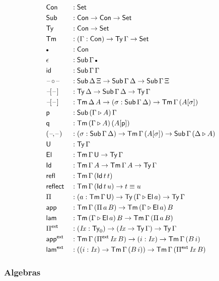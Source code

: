 \documentclass[12pt,a4paper,twoside,openany]{book}
\theoremstyle{remark}
\theoremstyle{definition}
\theoremstyle{theorem}
\newcommand{\mi}[1]{\mathit{#1}}
\newcommand{\ms}[1]{\mathsf{#1}}
\newcommand{\refl}{\mathsf{refl}}
\newcommand{\reflect}{\mathsf{reflect}}
\newcommand{\id}{\mathsf{id}}
\newcommand{\Con}{\mathsf{Con}}
\newcommand{\Sub}{\mathsf{Sub}}
\newcommand{\Tm}{\mathsf{Tm}}
\newcommand{\Ty}{\mathsf{Ty}}
\newcommand{\U}{\mathsf{U}}
\newcommand{\El}{\mathsf{El}}
\newcommand{\Id}{\mathsf{Id}}
\newcommand{\blank}{\mathord{\hspace{1pt}\text{--}\hspace{1pt}}}
\newcommand{\Set}{\mathsf{Set}}
\newcommand{\ext}{\triangleright}
\newcommand{\emptycon}{\scaleobj{.75}\bullet}
\newcommand{\Pie}{\Pi^{\mathsf{ext}}}
\newcommand{\appe}{\mathsf{app^{ext}}}
\newcommand{\lame}{\mathsf{lam^{ext}}}
\newcommand{\p}{\mathsf{p}}
\newcommand{\q}{\mathsf{q}}
\newcommand{\app}{\ms{app}}
\newcommand{\lam}{\ms{lam}}
\begin{document}
\begin{alignat*}{3}
  &\Con &&: \Set\\
  &\Sub &&: \Con \to \Con \to \Set\\
  &\Ty  &&: \Con \to \Set\\
  &\Tm  &&: (\Gamma : \Con) \to \Ty\,\Gamma \to \Set \\
  &\emptycon &&: \Con\\
  &\epsilon &&: \Sub\,\Gamma\,\emptycon\\
  &\id &&: \Sub\,\Gamma\,\Gamma\\
  &\blank\!\circ\!\blank &&: \Sub\,\Delta\,\Xi \to \Sub\,\Gamma\,\Delta \to \Sub\,\Gamma\,\Xi\\
  &\blank\![\blank] &&: \Ty\,\Delta \to \Sub\,\Gamma\,\Delta \to \Ty\,\Gamma\\
  &\blank\![\blank] &&: \Tm\,\Delta\,A \to (\sigma : \Sub\,\Gamma\,\Delta) \to \Tm\,\Gamma\,(A[\sigma])\\
  &\p &&: \Sub\,(\Gamma\ext A)\,\Gamma\\
  &\q &&: \Tm\,(\Gamma\ext A)\,(A[\p])\\
  &(\blank\!,\!\blank) &&: (\sigma : \Sub\,\Gamma\,\Delta) \to \Tm\,\Gamma\,(A[\sigma]) \to \Sub\,\Gamma\,(\Delta\ext A)\\
  &\U &&: \Ty\,\Gamma\\
  &\El &&: \Tm\,\Gamma\,\U \to \Ty\,\Gamma\\
  &\Id &&: \Tm\,\Gamma\,A \to \Tm\,\Gamma\,A \to \Ty\,\Gamma\\
  &\refl &&: \Tm\,\Gamma\,(\Id\,t\,t)\\
  &\reflect &&: \Tm\,\Gamma\,(\Id\,t\,u) \to t \equiv u\\
  &\Pi &&: (a : \Tm\,\Gamma\,\U) \to \Ty\,(\Gamma\ext \El\,a) \to \Ty\,\Gamma\\
  &\app &&: \Tm\,\Gamma\,(\Pi\,a\,B) \to \Tm\,(\Gamma \ext \El\,a)\,B\\
  &\lam &&: \Tm\,(\Gamma \ext \El\,a)\,B \to \Tm\,\Gamma\,(\Pi\,a\,B)\\
  &\Pie &&: (\mi{Ix} : \Ty_0) \to (\mi{Ix} \to \Ty\,\Gamma) \to \Ty\,\Gamma\\
  &\appe &&: \Tm\,\Gamma\,(\Pie\,\mi{Ix}\,B) \to (i : \mi{Ix}) \to \Tm\,\Gamma\,(B\,i)\\
  &\lame &&: ((i : \mi{Ix}) \to \Tm\,\Gamma\,(B\,i)) \to \Tm\,\Gamma\,(\Pie\,\mi{Ix}\,B)
\end{alignat*}

\subsubsection{Algebras}
\end{document}

